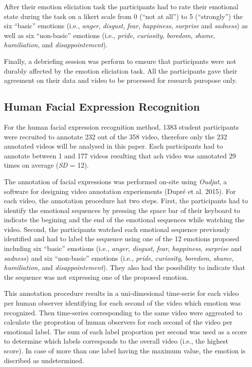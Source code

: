 \documentclass[conference,final,]{IEEEtran}
\begin{document}
After their emotion eliciation task the participants had to rate their
emotional state during the task on a likert scale from 0 (``not at
all'') to 5 (``strongly'') the six ``basic'' emotions (i.e.,
\emph{anger}, \emph{disgust}, \emph{fear}, \emph{happiness},
\emph{surprise} and \emph{sadness}) as well as six ``non-basic''
emotions (i.e., \emph{pride}, \emph{curiosity}, \emph{boredom},
\emph{shame}, \emph{humiliation}, and \emph{disappointement}).

Finally, a debriefing session was perform to emsure that participants
were not durably affected by the emotion eliciation task. All the
participants gave their agreement on their data and video to be
processed for research puropose only.

\hypertarget{human-facial-expression-recognition}{%
\subsection{Human Facial Expression
Recognition}\label{human-facial-expression-recognition}}

For the human facial expression recognition method, 1383 student
participants were recruited to annotate 232 out of the 358 video,
therefore only the 232 annotated videos will be analysed in this paper.
Each participants had to annotate between 1 and 177 videos resulting
that ach video was annotated 29 times on average (\emph{SD} = 12).

The annotation of facial expressions was performed on-site using
\emph{Oudjat}, a software for designing video annotation experiements
(Dupré et al. 2015). For each video, the annotation procedure hat two
steps. First, the participants had to identify the emotional sequences
by pressing the space bar of their keyboard to indicate the begining and
the end of the emotional sequences while watching the video. Second, the
participants watched each emotional sequence previously identified and
had to label the sequence using one of the 12 emotions proposed
including six ``basic'' emotions (i.e., \emph{anger}, \emph{disgust},
\emph{fear}, \emph{happiness}, \emph{surprise} and \emph{sadness}) and
six ``non-basic'' emotions (i.e., \emph{pride}, \emph{curiosity},
\emph{boredom}, \emph{shame}, \emph{humiliation}, and
\emph{disappointement}). They also had the possibility to indicate that
the sequence was not expressing one of the proposed emotion.

This annotation procedure results in a uni-dimesional time-serie for
each video per human observer identifying for each second of the video
which emotion was recognized. Then time-series corresponding to the same
video were aggreated to calculate the proprotion of human observers for
each second of the video per emotional label. The sum of each label
proportion per second was used as a score to determine which labels
corresponds to the overall video (i.e., the highest score). In case of
more than one label having the maximum value, the emotion is discribed
as undetermined.
\end{document}
